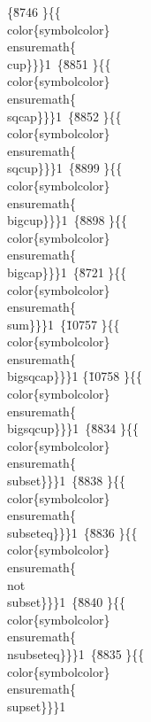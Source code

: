 {\{\u8746 \}\{\{\\color\{symbolcolor\}\\ensuremath\{\\cup\}\}\}1\
\{\u8851 \}\{\{\\color\{symbolcolor\}\\ensuremath\{\\sqcap\}\}\}1\
\{\u8852 \}\{\{\\color\{symbolcolor\}\\ensuremath\{\\sqcup\}\}\}1\
\{\u8899 \}\{\{\\color\{symbolcolor\}\\ensuremath\{\\bigcup\}\}\}1\
\{\u8898 \}\{\{\\color\{symbolcolor\}\\ensuremath\{\\bigcap\}\}\}1\
\{\u8721 \}\{\{\\color\{symbolcolor\}\\ensuremath\{\\sum\}\}\}1\
\{\u10757 \}\{\{\\color\{symbolcolor\}\\ensuremath\{\\bigsqcap\}\}\}1 %
\{\u10758 \}\{\{\\color\{symbolcolor\}\\ensuremath\{\\bigsqcup\}\}\}1\
\{\u8834 \}\{\{\\color\{symbolcolor\}\\ensuremath\{\\subset\}\}\}1\
\{\u8838 \}\{\{\\color\{symbolcolor\}\\ensuremath\{\\subseteq\}\}\}1\
\{\u8836 \}\{\{\\color\{symbolcolor\}\\ensuremath\{\\not\\subset\}\}\}1\
\{\u8840 \}\{\{\\color\{symbolcolor\}\\ensuremath\{\\nsubseteq\}\}\}1\
\{\uc0\u8835 \}\{\{\\color\{symbolcolor\}\\ensuremath\{\\supset\}\}\}1\
}
